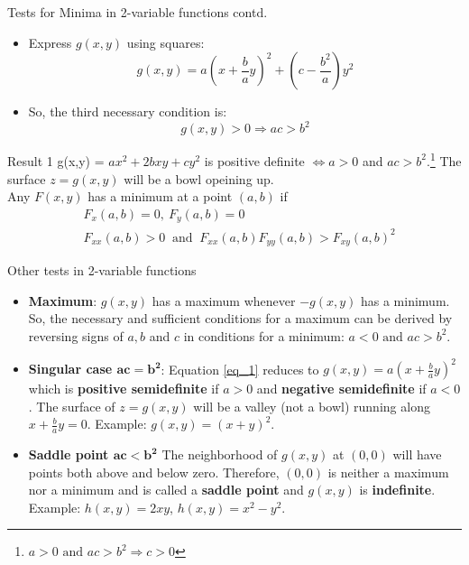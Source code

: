 \documentclass{beamer}
\begin{document}
\begin{frame}{Tests for Minima in 2-variable functions contd.}{}
\begin{itemize}
    \item Express $g(x,y)$ using squares:
        \begin{equation}
            g(x,y) = a\left(x + \frac{b}{a}y\right)^2 + \left(c - \frac{b^2}{a}\right)y^2
        \label{eq_1}
        \end{equation}
    \item So, the third necessary condition is: 
    \begin{equation*}
        g(x,y) > 0 \Rightarrow ac > b^2
    \end{equation*}
\end{itemize}
\begin{block}{Result 1}
g(x,y) = $ax^2 + 2bxy + cy^2$ is positive definite $\iff a > 0$ and $ac > b^2$.\footnote{$a > 0 \text{ and } ac > b^2 \Rightarrow c > 0$} The surface $z=g(x,y)$ will be a bowl opeining up.\\
Any $F(x,y)$ has a minimum at a point $(a,b)$ if 
\begin{align*}
&F_x(a,b) = 0, \ F_y(a,b) = 0\\
&F_{xx}(a,b) > 0 \ \text{ and }\  F_{xx}(a,b)F_{yy}(a,b) > F_{xy}(a,b)^2
\end{align*}
\end{block}
\end{frame}

\begin{frame}{Other tests in 2-variable functions}{}
\begin{itemize}
    \item \textbf{Maximum}: $g(x,y)$ has a maximum whenever $-g(x,y)$ has a minimum. So, the necessary and sufficient conditions for a maximum can be derived by reversing signs of $a,b$ and $c$ in conditions for a minimum: $a < 0 \text{ and } ac > b^2$.
    \item \textbf{Singular case $\mathbf{ac = b^2}$}: Equation \ref{eq_1} reduces to $g(x,y) = a\left(x + \frac{b}{a}y\right)^2$ which is \textbf{positive semidefinite} if $a>0$ and \textbf{negative semidefinite} if $a<0$. The surface of $z = g(x,y)$ will be a valley (not a bowl) running along $x+\frac{b}{a}y = 0$. Example: $g(x,y) = (x+y)^2$.
    \item \textbf{Saddle point $\mathbf{ac < b^2}$} The neighborhood of $g(x,y)$ at $(0,0)$ will have points both above and below zero. Therefore, $(0,0)$ is neither a maximum nor a minimum and is called a \textbf{saddle point} and $g(x,y)$ is \textbf{indefinite}. Example: $h(x,y) = 2xy$, $h(x,y) = x^2 - y^2$.
\end{itemize}
\end{frame}
\end{document}
